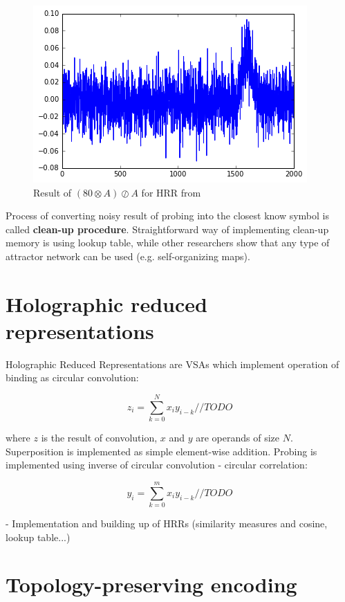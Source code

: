 \documentclass[conference]{IEEEtran}
\begin{document}
\begin{figure}
\center
\includegraphics[width=0.9\columnwidth]{img/scalar-probe.png}
\caption{Result of $(80 \otimes A) \oslash A$ for HRR from}
\end{figure}

Process of converting noisy result of probing into the closest know symbol is called \textbf{clean-up procedure}. Straightforward way of implementing clean-up memory is using lookup table, while other researchers show that any type of attractor network can be used (e.g. self-organizing maps).

\section{Holographic reduced representations}


Holographic Reduced Representations are VSAs which implement operation of binding as circular convolution:

\begin{equation}
z_i=\sum_{k=0}^{N}{x_iy_{i-k}} //TODO
\end{equation}

where $z$ is the result of convolution, $x$ and $y$ are operands of size $N$. Superposition is implemented as simple element-wise addition. Probing is implemented using inverse of circular convolution - circular correlation:

\begin{equation}
y_i=\sum_{k=0}^{m}{x_iy_{i-k}} //TODO
\end{equation} 

- Implementation and building up of HRRs (similarity measures and cosine, lookup table...)


\section{Topology-preserving encoding}
\end{document}
